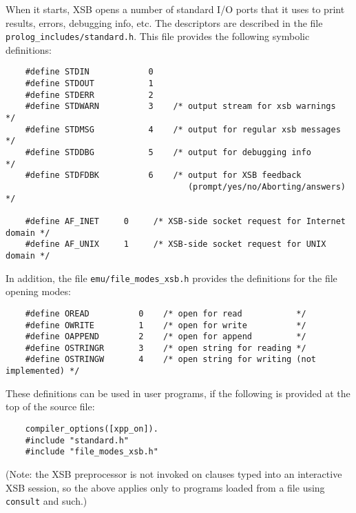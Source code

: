 When it starts, XSB opens a number of standard I/O ports that it uses to
print results, errors, debugging info, etc. The descriptors are described
in the file {\tt prolog\_includes/standard.h}. This file provides the
following symbolic definitions:
\begin{verbatim}
    #define STDIN            0
    #define STDOUT           1
    #define STDERR           2
    #define STDWARN          3    /* output stream for xsb warnings  */
    #define STDMSG           4    /* output for regular xsb messages */
    #define STDDBG           5    /* output for debugging info       */
    #define STDFDBK          6    /* output for XSB feedback
                                     (prompt/yes/no/Aborting/answers) */

    #define AF_INET     0     /* XSB-side socket request for Internet domain */
    #define AF_UNIX     1     /* XSB-side socket request for UNIX domain */
\end{verbatim}
In addition, the file \verb|emu/file_modes_xsb.h| provides the definitions
for the file opening modes:
\begin{verbatim}
    #define OREAD          0    /* open for read           */
    #define OWRITE         1    /* open for write          */
    #define OAPPEND        2    /* open for append         */
    #define OSTRINGR       3    /* open string for reading */
    #define OSTRINGW       4    /* open string for writing (not implemented) */
\end{verbatim}
These definitions can be used in user programs, if the following is
provided at the top of the source file:
\begin{verbatim}
    compiler_options([xpp_on]).
    #include "standard.h"
    #include "file_modes_xsb.h"
\end{verbatim}
(Note: the XSB preprocessor is not invoked on clauses typed into an
interactive XSB session, so the above applies only to programs loaded from
a file using {\tt consult} and such.)

